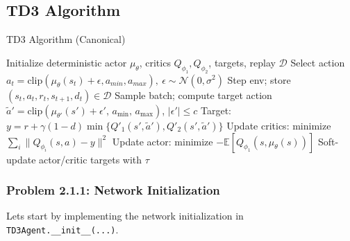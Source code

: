\documentclass[12pt]{article}
\begin{document}
\subsection*{TD3 Algorithm}
\begin{algorithm}
\caption{TD3 Algorithm (Canonical)}
\begin{algorithmic}[1]
\State Initialize deterministic actor \(\mu_\theta\), critics \(Q_{\phi_1},Q_{\phi_2}\), targets, replay \(\mathcal{D}\)
  \State Select action \(a_t=\text{clip}(\mu_\theta(s_t)+\epsilon, a_{min},a_{max}),\ \epsilon\sim\mathcal{N}(0,\sigma^2)\)
  \State Step env; store \((s_t,a_t,r_t,s_{t+1},d_t)\in\mathcal{D}\)
    \State Sample batch; compute target action \(\tilde a' = \text{clip}(\mu_{\theta'}(s')+\epsilon',\, a_{\min},\, a_{\max})\), \(|\epsilon'|\le c\)
    \State Target: \(y=r+\gamma(1-d)\min\{Q'_{1}(s',\tilde a'),Q'_{2}(s',\tilde a')\}\)
    \State Update critics: minimize \(\sum_i \|Q_{\phi_i}(s,a)-y\|^2\)
      \State Update actor: minimize \(-\mathbb{E}[Q_{\phi_1}(s, \mu_\theta(s))]\)
      \State Soft-update actor/critic targets with \(\tau\)
    \EndIf
  \EndIf
\EndFor
\end{algorithmic}
\end{algorithm}




\subsubsection*{Problem 2.1.1: Network Initialization}
Lets start by implementing the network initialization in \texttt{TD3Agent.__init__(...)}.
\end{document}
